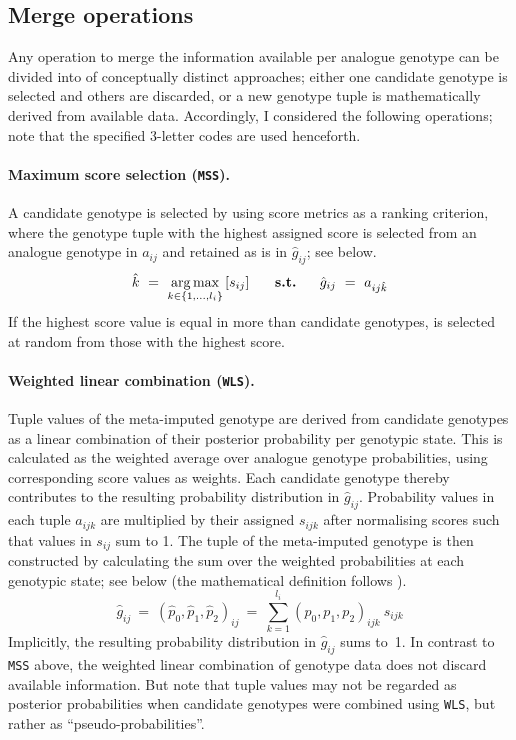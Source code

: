 %
\subsection{Merge operations}
\label{metaimpute_merge}
%

Any operation to merge the information available per analogue genotype can be divided into  of  conceptually distinct approaches; either one candidate genotype is selected and others are discarded, or a new genotype tuple is mathematically derived from available data.
Accordingly, I considered the following  operations; note that the specified 3-letter codes are used henceforth.

\paragraph{Maximum score selection (\texttt{MSS}).}
A candidate genotype is selected by using score metrics as a ranking criterion, where the genotype tuple with the highest assigned score is selected from an analogue genotype in $a_{ij}$ and retained as is in $\hat{g}_{ij}$; see below.
\begin{equation}
	\hat{k} ~=~ \operatorname*{arg\,max}_{k \in \{ 1,\ldots,l_i \}} \left[ s_{ij} \right]
	~ \quad ~ \textbf{s.t.} ~ \quad ~
	\hat{g}_{ij} ~=~ a_{ij\hat{k}}
\end{equation}
If the highest score value is equal in more than  candidate genotypes,  is selected at random from those with the highest score.

\paragraph{Weighted linear combination (\texttt{WLS}).}
Tuple values of the meta-imputed genotype are derived from candidate genotypes as a linear combination of their posterior probability per genotypic state.
This is calculated as the weighted average over analogue genotype probabilities, using corresponding score values as weights.
Each candidate genotype thereby contributes to the resulting probability distribution in $\hat{g}_{ij}$.
Probability values in each tuple $a_{ijk}$ are multiplied by their assigned $s_{ijk}$ after normalising scores such that values in $s_{ij}$ sum to 1.
The tuple of the meta-imputed genotype is then constructed by calculating the sum over the weighted probabilities at each genotypic state; see below (the mathematical definition follows \citet{Stone:1961js}).
\begin{equation}\label{metaimpute_wlc}
\hat{g}_{ij} ~=~ {\left( \hat{p}_{0}, \hat{p}_{1}, \hat{p}_{2} \right)}_{ij} ~=~
\sum_{k = 1}^{l_i}  {\left( p_{0}, p_{1}, p_{2} \right)}_{ijk} ~ s_{ijk}
\end{equation}
Implicitly, the resulting probability distribution in $\hat{g}_{ij}$ sums to~1.
In contrast to \texttt{MSS} above, the weighted linear combination of genotype data does not discard available information.
But note that tuple values may not be regarded as posterior probabilities when candidate genotypes were combined using \texttt{WLS}, but rather as ``pseudo-probabilities''.



